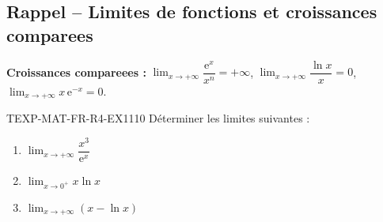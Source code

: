 

\subsection*{Rappel -- Limites de fonctions et croissances comparees}

\textbf{Croissances compareees :} $\lim_{x \to +\infty} \dfrac{\mathrm{e}^x}{x^n} = +\infty$, $\lim_{x \to +\infty} \dfrac{\ln x}{x} = 0$, $\lim_{x \to +\infty} x\,\mathrm{e}^{-x} = 0$.

\begin{exercice}{TEXP-MAT-FR-R4-EX1}{1}{10}
Déterminer les limites suivantes :
\begin{enumerate}
  \item $\lim_{x \to +\infty} \dfrac{x^3}{\mathrm{e}^x}$
  \item $\lim_{x \to 0^+} x \ln x$
  \item $\lim_{x \to +\infty} \left(x - \ln x\right)$
\end{enumerate}
\end{exercice}

